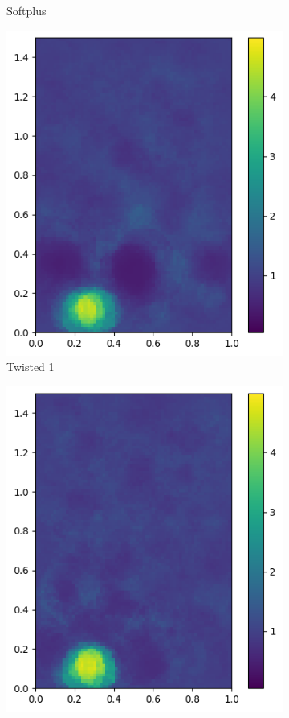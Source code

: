 \documentclass[12pt]{article}
\newcommand{\nhghaloesheight}{3.2cm}
\newcommand{\nhghaloeswidth}{2.6cm}
\begin{document}
\begin{figure}[h]
\begin{subfigure}[c]{\nhghaloeswidth}
    \caption{\label{fig:haloes_softplus} Softplus}
  \end{subfigure}    
  \begin{subfigure}[c]{\nhghaloeswidth}      
    \includegraphics[totalheight=\nhghaloesheight]{Figures/softplus_halos/ex1/mutanhshiftp50.png}
    \caption{\label{fig:haloes_tanhp50} Twisted 1}            
  \end{subfigure}    
  \begin{subfigure}[c]{\nhghaloeswidth}
    \includegraphics[totalheight=\nhghaloesheight]{Figures/softplus_halos/ex1/mutanhshiftp25.png}

\end{subfigure}
\end{figure}
\end{document}

